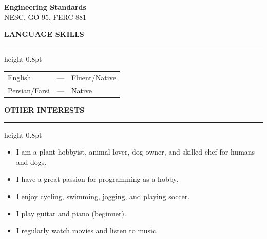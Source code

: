 \documentclass[10pt, letterpaper]{article}
\newcommand{\rsection}[1]{%
  \vspace{10pt}%
  {\large\bfseries\MakeUppercase{#1}}%
  \vspace{1pt}%
  \hrule height 0.8pt%
  \vspace{5pt}%
}
\newenvironment{rlist}{%
  \begin{itemize}[leftmargin=1.4em, itemsep=1pt, topsep=2pt, parsep=0pt]%
}{%
  \end{itemize}%
}
\begin{document}
\vspace{4pt}
\noindent\textbf{Engineering Standards}\\
NESC, GO-95, FERC-881

\rsection{Language Skills}

\vspace{2pt}
\begin{tabular}{@{}lll@{}}
  English & --- & Fluent/Native \\[2pt]
  Persian/Farsi & --- & Native \\[2pt]
\end{tabular}

\rsection{Other Interests}

\begin{rlist}
  \item I am a plant hobbyist, animal lover, dog owner, and skilled chef for humans and dogs.
  \item I have a great passion for programming as a hobby.
  \item I enjoy cycling, swimming, jogging, and playing soccer.
  \item I play guitar and piano (beginner).
  \item I regularly watch movies and listen to music.
\end{rlist}
\end{document}
